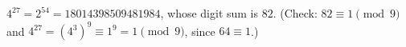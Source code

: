 $4^{27}=2^{54}=18014398509481984$, whose digit sum is $\boxed{82}$. (Check: $82\equiv1\pmod9$ and $4^{27}=(4^3)^9\equiv1^9=1\pmod9$, since $64\equiv1$.)
